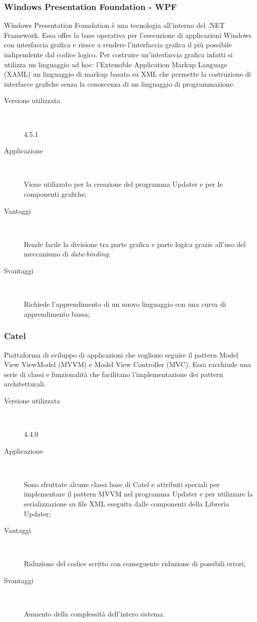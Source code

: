 \documentclass[../RelazioneFinale.tex]{subfiles}
\begin{document}
			\subsubsection{Windows Presentation Foundation - WPF}
				Windows Presentation Foundation è una tecnologia all'interno del .NET Framework. Essa offre la base operativa per l'esecuzione di applicazioni Windows con interfaccia grafica e riesce a rendere l'interfaccia grafica il più possibile indipendente dal codice logico. Per costruire un'interfaccia grafica infatti si utilizza un linguaggio ad hoc: l'Extensible Application Markup Language (XAML) un linguaggio di markup basato su XML che permette la costruzione di interfacce grafiche senza la conoscenza di un linguaggio di programmazione.
				\begin{description}
					\item[Versione utilizzata] \ \par 
					4.5.1
					\item[Applicazione] \ \par
					Viene utilizzato per la creazione del programma Updater e per le componenti grafiche;
					\item[Vantaggi] \ \par
					Rende facile la divisione tra parte grafica e parte logica grazie all'uso del meccanismo di \emph{data-binding};
					\item[Svantaggi] \ \par
					Richiede l'apprendimento di un nuovo linguaggio con una curva di apprendimento bassa;
				\end{description}		
			
			\subsubsection{Catel}
				Piattaforma di sviluppo di applicazioni che vogliono seguire il pattern Model View ViewModel (MVVM) e Model View Controller (MVC). Essa racchiude una serie di classi e funzionalità che facilitano l'implementazione dei pattern architetturali.
				\begin{description}
					\item[Versione utilizzata] \ \par 
					4.4.0
					\item[Applicazione] \ \par
					Sono sfruttate alcune classi base di Catel e attributi speciali per implementare il pattern MVVM nel programma Updater e per utilizzare la serializzazione su file XML eseguita dalle componenti della Libreria Updater;
					\item[Vantaggi] \ \par
					Riduzione del codice scritto con conseguente riduzione di possibili errori;
					\item[Svantaggi] \ \par
					Aumento della complessità dell'intero sistema.
				\end{description}
			
\end{document}
